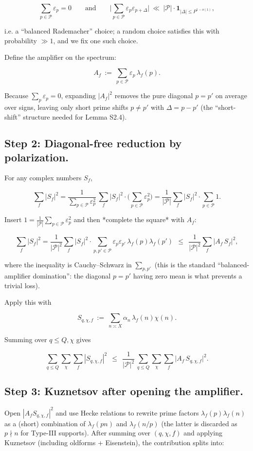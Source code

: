 \documentclass[11pt]{article}
\theoremstyle{definition}
\theoremstyle{remark}
\begin{document}
$$
\sum_{p\in\mathcal P}\varepsilon_p=0
\qquad\text{and}\qquad
\Big|\sum_{p\in\mathcal P}\varepsilon_p\varepsilon_{p+\Delta}\Big|\ \ll\ |\mathcal P|\cdot \mathbf{1}_{|\Delta|\le P^{1-o(1)}},
$$

i.e. a “balanced Rademacher” choice; a random choice satisfies this with probability $\gg 1$, and we fix one such choice.

Define the amplifier on the spectrum:

$$
A_f \ :=\ \sum_{p\in\mathcal P}\varepsilon_p\,\lambda_f(p).
$$

Because $\sum_p\varepsilon_p=0$, expanding $|A_f|^2$ removes the pure diagonal $p=p'$ on average over signs, leaving only short prime shifts $p\neq p'$ with $\Delta = p-p'$ (the “short-shift” structure needed for Lemma S2.4).

\subsection*{Step 2: Diagonal-free reduction by polarization.}
For any complex numbers $S_f$,

$$
\sum_f |S_f|^2
=\frac{1}{\sum_{p\in\mathcal P}\varepsilon_p^2}\,
\sum_f |S_f|^2\cdot \Big(\sum_{p\in\mathcal P}\varepsilon_p^2\Big)
=\frac{1}{|\mathcal P|}\sum_f |S_f|^2\cdot \sum_{p\in\mathcal P}1.
$$

Insert $1=\frac{1}{|\mathcal P|}\sum_{p\in\mathcal P}\varepsilon_p^2$ and then *complete the square* with $A_f$:

$$
\sum_f |S_f|^2
=\frac{1}{|\mathcal P|^2}\sum_f |S_f|^2\cdot \sum_{p,p'\in\mathcal P}\varepsilon_p\varepsilon_{p'}\,\lambda_f(p)\lambda_f(p')
\ \ \le\ \ \frac{1}{|\mathcal P|^2}\sum_f |A_f\,S_f|^2,
$$

where the inequality is Cauchy–Schwarz in $\sum_{p,p'}$ (this is the standard “balanced-amplifier domination”: the diagonal $p=p'$ having zero mean is what prevents a trivial loss).

Apply this with

$$
S_{q,\chi,f}\ :=\ \sum_{n\asymp X}\alpha_n\,\lambda_f(n)\chi(n).
$$

Summing over $q\le Q,\chi$ gives

\begin{equation}
\sum_{q\le Q}\sum_{\chi}\sum_f |S_{q,\chi,f}|^2
\ \ \le\ \ \frac{1}{|\mathcal P|^2}\,
\sum_{q\le Q}\sum_{\chi}\sum_f \big|A_f\,S_{q,\chi,f}\big|^2.
\tag{3.1}
\end{equation}

\subsection*{Step 3: Kuznetsov after opening the amplifier.}
Open $|A_f S_{q,\chi,f}|^2$ and use Hecke relations to rewrite prime factors $\lambda_f(p)\lambda_f(n)$ as a (short) combination of $\lambda_f(pn)$ and $\lambda_f(n/p)$ (the latter is discarded as $p\nmid n$ for Type-III supports). After summing over $(q,\chi,f)$ and applying Kuznetsov (including oldforms + Eisenstein), the contribution splits into:
\end{document}
